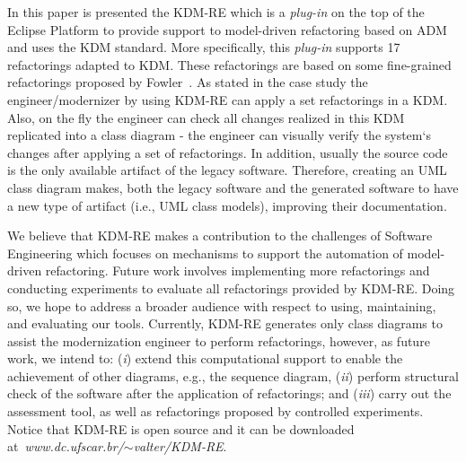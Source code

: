 In this paper is presented the KDM-RE which is a \textit{plug-in} on the top of the Eclipse Platform to provide support to model-driven refactoring based on ADM and uses the KDM standard. More specifically, this \textit{plug-in} supports 17 refactorings adapted to KDM. These refactorings are based on some fine-grained refactorings proposed by Fowler~\cite{refactImpro}. As stated in the case study the engineer/modernizer by using KDM-RE can apply a set refactorings in a KDM. Also, on the fly the engineer can check all changes realized in this KDM replicated into a class diagram - the engineer can visually verify the system`s changes after applying a set of refactorings. In addition, usually the source code is the only available artifact of the legacy software. 
Therefore, creating an UML class diagram makes, both the legacy software and the generated software to have a new type of artifact (i.e., UML class models), improving their documentation. %



We believe that KDM-RE makes a contribution to the challenges of Software Engineering which focuses on mechanisms to support the automation of model-driven refactoring. Future work involves implementing more refactorings and conducting experiments to evaluate all refactorings provided by KDM-RE. Doing so, we hope to address a broader
audience with respect to using, maintaining, and evaluating
our tools. Currently, KDM-RE generates only class diagrams to assist the modernization engineer to perform refactorings, however, as future work, we intend to: (\textit{i}) extend this computational support to enable the achievement of other diagrams, e.g.,  the sequence diagram, (\textit{ii}) perform structural check of the software after the application of refactorings; and (\textit{iii}) carry out the assessment tool, as well as refactorings proposed by controlled experiments. Notice that KDM-RE is open source and it can be downloaded at\textit{~www.dc.ufscar.br/$\sim$valter/KDM-RE}.